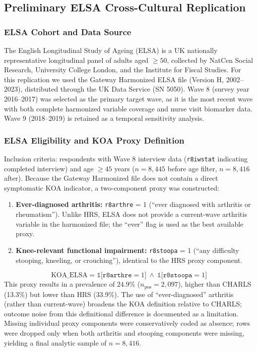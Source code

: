 \documentclass[11pt,a4paper]{article}
\begin{document}
\subsection{Preliminary ELSA Cross-Cultural Replication}

\subsubsection*{ELSA Cohort and Data Source}
The English Longitudinal Study of Ageing (ELSA) is a UK nationally representative longitudinal
panel of adults aged $\geq 50$, collected by NatCen Social Research, University College London,
and the Institute for Fiscal Studies. For this replication we used the Gateway Harmonized ELSA
file (Version H, 2002--2023), distributed through the UK Data Service (SN 5050). Wave 8 (survey
year 2016--2017) was selected as the primary target wave, as it is the most recent wave with
both complete harmonized variable coverage and nurse visit biomarker data. Wave 9 (2018--2019)
is retained as a temporal sensitivity analysis.

\subsubsection*{ELSA Eligibility and KOA Proxy Definition}
Inclusion criteria: respondents with Wave 8 interview data (\texttt{r8iwstat} indicating completed
interview) and age $\geq 45$ years ($n=8{,}445$ before age filter, $n=8{,}416$ after). Because the
Gateway Harmonized file does not contain a direct symptomatic KOA indicator, a two-component proxy
was constructed:
\begin{enumerate}
  \item \textbf{Ever-diagnosed arthritis:} \texttt{r8arthre} = 1 (``ever diagnosed with
        arthritis or rheumatism''). Unlike HRS, ELSA does not provide a current-wave arthritis
        variable in the harmonized file; the ``ever'' flag is used as the best available proxy.
  \item \textbf{Knee-relevant functional impairment:} \texttt{r8stoopa} = 1 (``any difficulty
        stooping, kneeling, or crouching''), identical to the HRS proxy component.
\end{enumerate}
\[
\text{KOA\_ELSA} = \mathbb{1}\bigl[\texttt{r8arthre}=1\bigr]\ \wedge\
\mathbb{1}\bigl[\texttt{r8stoopa}=1\bigr]
\]
This proxy results in a prevalence of $24.9\%$ ($n_{\text{pos}}=2{,}097$), higher than CHARLS
(13.3\%) but lower than HRS (33.9\%). The use of ``ever-diagnosed'' arthritis (rather than
current-wave) broadens the KOA definition relative to CHARLS; outcome noise from this
definitional difference is documented as a limitation. Missing individual proxy components
were conservatively coded as absence; rows were dropped only when both arthritis and
stooping components were missing, yielding a final analytic sample of $n=8{,}416$.
\end{document}
